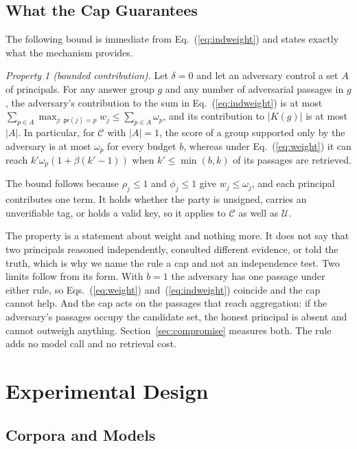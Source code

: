 \documentclass[lettersize,journal]{IEEEtran}
\newcommand{\AdvU}{\mathcal{U}}
\newcommand{\AdvC}{\mathcal{C}}
\newcommand{\prin}{\mathsf{pr}}
\begin{document}
\subsection{What the Cap Guarantees}

The following bound is immediate from Eq.~(\ref{eq:indweight}) and states exactly what the
mechanism provides.

\emph{Property 1 (bounded contribution).} Let $\delta = 0$ and let an adversary control a set
$A$ of principals. For any answer group $g$ and any number of adversarial passages in $g$, the
adversary's contribution to the sum in Eq.~(\ref{eq:indweight}) is at most
$\sum_{p \in A} \max_{j:\,\prin(j)=p} w_j \le \sum_{p \in A} \omega_p$, and its contribution to
$|K(g)|$ is at most $|A|$. In particular, for $\AdvC$ with $|A| = 1$, the score of a group
supported only by the adversary is at most $\omega_p$ for every budget $b$, whereas under
Eq.~(\ref{eq:weight}) it can reach $k' \omega_p (1 + \beta(k'-1))$ when $k' \le \min(b, k)$ of
its passages are retrieved.

The bound follows because $\rho_j \le 1$ and $\phi_j \le 1$ give $w_j \le \omega_j$, and each
principal contributes one term. It holds whether the party is unsigned, carries an
unverifiable tag, or holds a valid key, so it applies to $\AdvC$ as well as $\AdvU$.

The property is a statement about weight and nothing more. It does not say that two principals
reasoned independently, consulted different evidence, or told the truth, which is why we name
the rule a cap and not an independence test. Two limits follow from its form. With $b = 1$
the adversary has one passage under either rule, so Eqs.~(\ref{eq:weight})
and~(\ref{eq:indweight}) coincide and the cap cannot help. And the cap acts on the passages
that reach aggregation: if the adversary's passages occupy the candidate set, the honest
principal is absent and cannot outweigh anything. Section~\ref{sec:compromise} measures both.
The rule adds no model call and no retrieval cost.

\section{Experimental Design}
\label{sec:experiments}

\subsection{Corpora and Models}
\end{document}
